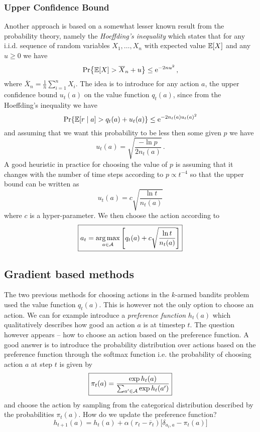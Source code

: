 \documentclass{myclass}
\begin{document}
\subsubsection{Upper Confidence Bound}

Another approach is based on a somewhat lesser known result from the probability theory, namely the
\emph{Hoeffding's inequality} which states that for any i.i.d. sequence of random variables
$X_1,\ldots,X_n$ with expected value $\mathbb{E}[X]$ and any $u \geq 0$ we have
\[
    \Pr{\mathbb{E}[X] > \overline{X}_n + u} \leq \mathrm{e}^{-2nu^2}\,,
\]
where $\displaystyle\overline{X}_n = \frac{1}{n} \sum_{i=1}^n X_i$. The idea is to introduce for any
action $a$, the upper confidence bound $u_t(a)$ on the value function $q_t(a)$, since from the
Hoeffding's inequality we have
\[
    \Pr{\mathbb{E}[r \mid a] > q_t(a) + u_t(a)} \leq \mathrm{e}^{-2 n_t(a) u_t(a)^2}
\]
and assuming that we want this probability to be less then some given $p$ we have
\[
    u_t(a) = \sqrt{\frac{-\ln p}{2 n_t(a)}}\,.
\]
A good heuristic in practice for choosing the value of $p$ is assuming that it changes with the
number of time steps according to $p \propto t^{-4}$ so that the upper bound can be written as
\[
\boxed
{
    u_t(a) = c \sqrt{\frac{\ln t}{n_t(a)}}
}
\]
where $c$ is a hyper-parameter. We then choose the action according to
\[
\boxed
{
    a_t = \operatorname*{arg\,max}_{a \in \mathcal{A}} \left[ q_t(a) + c \sqrt{\frac{\ln t}{n_t(a)}} \right]
}
\]


\subsection{Gradient based methods}

The two previous methods for choosing actions in the $k$-armed bandits problem used the value
function $q_t(a)$. This is however not the only option to choose an action. We can for example
introduce a \emph{preference function} $h_t(a)$ which qualitatively describes how good an action $a$
is at timestep $t$. The question however appears -- how to choose an action based on the preference
function. A good answer is to introduce the probability distribution over actions based on the
preference function through the softmax function i.e. the probability of choosing action $a$ at step
$t$ is given by
\[
\boxed
{
    \pi_t(a) = \frac{\exp h_t(a) }{\sum_{a' \in \mathcal{A}} \exp h_t(a')}
}
\]
and choose the action by sampling from the categorical distribution described by the probabilities
$\pi_t(a)$. How do we update the preference function? 
\[
\boxed
{
    h_{t+1}(a) = h_{t}(a) + \alpha (r_t - \overline{r}_t)\big[ \delta_{a_t, a} - \pi_t(a) \big]
}
\]
\end{document}
